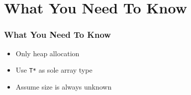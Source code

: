 \section{What You Need To Know}

\frame{\tableofcontents[currentsection]}

\begin{frame}
  \frametitle{What You Need To Know}
  \begin{itemize}
    \item Only heap allocation
    \item Use \texttt{T*} as sole array type
    \item Assume size is always unknown
  \end{itemize}
\end{frame}




